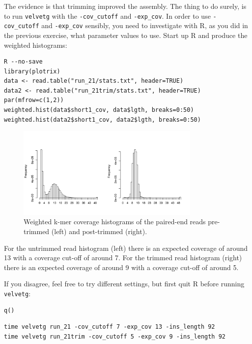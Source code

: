 \begin{steps}
The evidence is that trimming improved the assembly. The thing to do surely, is
to run \texttt{velvetg} with the \texttt{-cov\_cutoff} and \texttt{-exp\_cov}. In order
to use \texttt{-cov\_cutoff} and \texttt{-exp\_cov} sensibly, you need to
investigate with R, as you did in the previous exercise, what parameter values
to use. Start up R and produce the weighted histograms:
\begin{lstlisting}[style=R]
R --no-save
library(plotrix) 
data <- read.table("run_21/stats.txt", header=TRUE) 
data2 <- read.table("run_21trim/stats.txt", header=TRUE) 
par(mfrow=c(1,2))
weighted.hist(data$short1_cov, data$lgth, breaks=0:50)
weighted.hist(data2$short1_cov, data2$lgth, breaks=0:50)
\end{lstlisting}

\begin{figure}[H]
\centering
\includegraphics[width=0.8\textwidth]{handout/velvet/velvet_Rplot002.png}
\caption{\label{fig:velvet_Rplot002} Weighted k-mer coverage histograms of the paired-end reads pre-trimmed (left) and post-trimmed (right).}
\end{figure}

For the untrimmed read histogram (left) there is an expected coverage of around
13 with a coverage cut-off of around 7. For the trimmed read histogram (right)
there is an expected coverage of around 9 with a coverage cut-off of around 5.

If you disagree, feel free to try different settings, but first quit R before
running \texttt{velvetg}:
\begin{lstlisting}[style=R]
q()
\end{lstlisting}

\begin{lstlisting}
time velvetg run_21 -cov_cutoff 7 -exp_cov 13 -ins_length 92
time velvetg run_21trim -cov_cutoff 5 -exp_cov 9 -ins_length 92
\end{lstlisting}

\end{steps}

